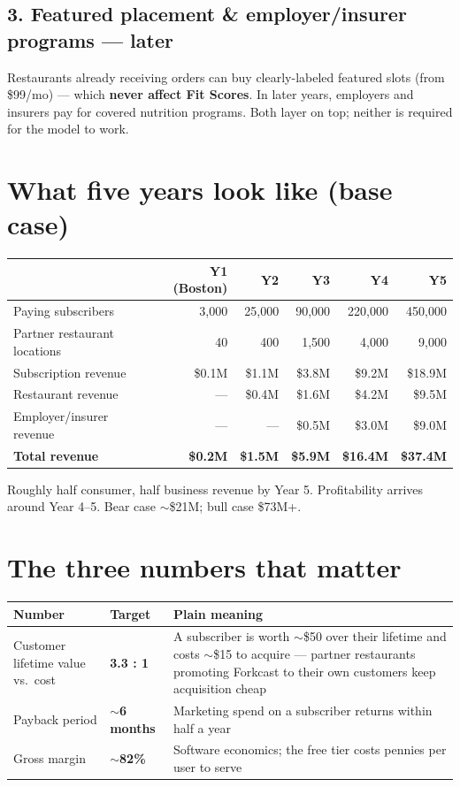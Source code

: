 \documentclass[10pt]{article}
\begin{document}
\subsection*{\textcolor{accent}{3.} Featured placement \& employer/insurer programs — later}
Restaurants already receiving orders can buy clearly-labeled featured slots (from \$99/mo) --- which \textbf{never affect Fit Scores}. In later years, employers and insurers pay for covered nutrition programs. Both layer on top; neither is required for the model to work.

\section{What five years look like (base case)}

\begin{tabularx}{\textwidth}{@{}L r r r r r@{}}
\toprule
 & \textbf{Y1 (Boston)} & \textbf{Y2} & \textbf{Y3} & \textbf{Y4} & \textbf{Y5}\\
\midrule
Paying subscribers & 3,000 & 25,000 & 90,000 & 220,000 & 450,000\\
Partner restaurant locations & 40 & 400 & 1,500 & 4,000 & 9,000\\
\midrule
Subscription revenue & \$0.1M & \$1.1M & \$3.8M & \$9.2M & \$18.9M\\
Restaurant revenue & --- & \$0.4M & \$1.6M & \$4.2M & \$9.5M\\
Employer/insurer revenue & --- & --- & \$0.5M & \$3.0M & \$9.0M\\
\textbf{Total revenue} & \textbf{\$0.2M} & \textbf{\$1.5M} & \textbf{\$5.9M} & \textbf{\$16.4M} & \textbf{\$37.4M}\\
\bottomrule
\end{tabularx}

\vspace{4pt}
{\small\color{muted}Roughly half consumer, half business revenue by Year 5. Profitability arrives around Year 4--5. Bear case $\sim$\$21M; bull case \$73M+.}

\section{The three numbers that matter}

\begin{tabularx}{\textwidth}{@{}l l L@{}}
\toprule
\textbf{Number} & \textbf{Target} & \textbf{Plain meaning}\\
\midrule
Customer lifetime value vs.\ cost & \textbf{3.3 : 1} & A subscriber is worth $\sim$\$50 over their lifetime and costs $\sim$\$15 to acquire --- partner restaurants promoting Forkcast to their own customers keep acquisition cheap\\
Payback period & \textbf{$\sim$6 months} & Marketing spend on a subscriber returns within half a year\\
Gross margin & \textbf{$\sim$82\%} & Software economics; the free tier costs pennies per user to serve\\
\bottomrule
\end{tabularx}
\end{document}

